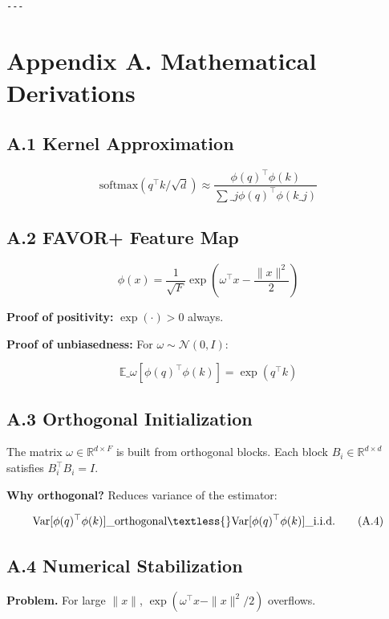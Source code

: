 \begin{lstlisting}

---
\end{lstlisting}


\section{Appendix A. Mathematical Derivations}

\subsection{A.1 Kernel Approximation}

\[
\text{softmax}(q^\top k / \sqrt{d}) \approx \frac{\phi(q)^\top \phi(k)}{\sum\_j \phi(q)^\top \phi(k\_j)}
\tag{A.1}
\]

\subsection{A.2 FAVOR+ Feature Map}

\[
\phi(x) = \frac{1}{\sqrt{F}} \exp\!\left(\omega^\top x - \frac{\|x\|^2}{2}\right)
\tag{A.2}
\]

\textbf{Proof of positivity:} $\exp(\cdot) > 0$ always.

\textbf{Proof of unbiasedness:} For $\omega \sim \mathcal{N}(0, I)$:

\[
\mathbb{E}\_\omega[\phi(q)^\top \phi(k)] = \exp(q^\top k)
\tag{A.3}
\]

\subsection{A.3 Orthogonal Initialization}

The matrix $\omega \in \mathbb{R}^{d \times F}$ is built from orthogonal 
blocks. Each block $B_i \in \mathbb{R}^{d \times d}$ satisfies 
$B_i^\top B_i = I$.

\textbf{Why orthogonal?} Reduces variance of the estimator:

\[
\text{Var}[\phi(q)^\top \phi(k)]\_{\text{orthogonal}} \textless{} \text{Var}[\phi(q)^\top \phi(k)]\_{\text{i.i.d.}}
\tag{A.4}
\]

\subsection{A.4 Numerical Stabilization}

\textbf{Problem.} For large $\|x\|$, $\exp(\omega^\top x - \|x\|^2/2)$ overflows.

